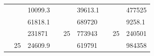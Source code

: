 \begin{table}[]
\begin{tabular}{|cclccllll}
\rowcolor[HTML]{DAE8FC} 
\multicolumn{1}{|c|}{\cellcolor[HTML]{FFFFC7}}                                & \multicolumn{1}{c|}{\cellcolor[HTML]{DAE8FC}}                      & \multicolumn{1}{l|}{\cellcolor[HTML]{DAE8FC}10099.3}   & \multicolumn{1}{c|}{\cellcolor[HTML]{FFFFC7}}                                & \multicolumn{1}{c|}{\cellcolor[HTML]{DAE8FC}}                       & \multicolumn{1}{l|}{\cellcolor[HTML]{DAE8FC}39613.1}   & \multicolumn{1}{c|}{\cellcolor[HTML]{FFFFC7}}                                & \multicolumn{1}{c|}{\cellcolor[HTML]{DAE8FC}}                      & \multicolumn{1}{l|}{\cellcolor[HTML]{DAE8FC}477525}    \\ \cline{3-3} \cline{6-6} \cline{9-9} 
\multicolumn{1}{|c|}{\cellcolor[HTML]{FFFFC7}}                                & \multicolumn{1}{c|}{\cellcolor[HTML]{DAE8FC}}                      & \multicolumn{1}{l|}{\cellcolor[HTML]{DDFDFF}61818.1}   & \multicolumn{1}{c|}{\cellcolor[HTML]{FFFFC7}}                                & \multicolumn{1}{c|}{\cellcolor[HTML]{DAE8FC}}                       & \multicolumn{1}{l|}{\cellcolor[HTML]{DDFDFF}689720}    & \multicolumn{1}{c|}{\cellcolor[HTML]{FFFFC7}}                                & \multicolumn{1}{c|}{\cellcolor[HTML]{DAE8FC}}                      & \multicolumn{1}{l|}{\cellcolor[HTML]{DDFDFF}9258.1}    \\ \cline{3-3} \cline{6-6} \cline{9-9} 
\rowcolor[HTML]{DAE8FC} 
\multicolumn{1}{|c|}{\cellcolor[HTML]{FFFFC7}}                                & \multicolumn{1}{c|}{\cellcolor[HTML]{DAE8FC}}                      & \multicolumn{1}{l|}{\cellcolor[HTML]{DAE8FC}231871}    & \multicolumn{1}{c|}{\cellcolor[HTML]{FFFFC7}}                                & \multicolumn{1}{c|}{\multirow{-9}{*}{\cellcolor[HTML]{DAE8FC}25}}   & \multicolumn{1}{l|}{\cellcolor[HTML]{DAE8FC}773943}    & \multicolumn{1}{c|}{\cellcolor[HTML]{FFFFC7}}                                & \multicolumn{1}{c|}{\multirow{-9}{*}{\cellcolor[HTML]{DAE8FC}25}}  & \multicolumn{1}{l|}{\cellcolor[HTML]{DAE8FC}240501}    \\ \cline{3-3} \cline{5-6} \cline{8-9} 
\multicolumn{1}{|c|}{\cellcolor[HTML]{FFFFC7}}                                & \multicolumn{1}{c|}{\multirow{-10}{*}{\cellcolor[HTML]{DAE8FC}25}} & \multicolumn{1}{l|}{\cellcolor[HTML]{DDFDFF}24609.9}   & \multicolumn{1}{c|}{\cellcolor[HTML]{FFFFC7}}                                & \multicolumn{1}{c|}{\cellcolor[HTML]{DDFDFF}}                       & \multicolumn{1}{l|}{\cellcolor[HTML]{DAE8FC}619791}    & \multicolumn{1}{c|}{\cellcolor[HTML]{FFFFC7}}                                & \multicolumn{1}{c|}{\cellcolor[HTML]{DDFDFF}}                      & \multicolumn{1}{l|}{\cellcolor[HTML]{DAE8FC}984358}    \\ \cline{2-3} \cline{6-6} \cline{9-9} 

\end{tabular}
\end{table}
